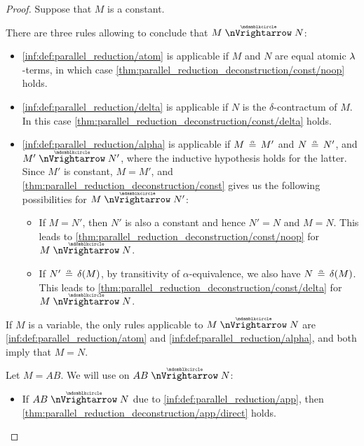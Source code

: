 \begin{proof}
   Suppose that \( M \) is a constant.

  There are three rules allowing to conclude that \( M \ppred N \):
  \begin{itemize}
    \item \ref{inf:def:parallel_reduction/atom} is applicable if \( M \) and \( N \) are equal atomic \( {\mathrm \lambda} \)-terms, in which case \cref{thm:parallel_reduction_deconstruction/const/noop} holds.

    \item \ref{inf:def:parallel_reduction/delta} is applicable if \( N \) is the \( \delta \)-contractum of \( M \). In this case \cref{thm:parallel_reduction_deconstruction/const/delta} holds.

    \item \ref{inf:def:parallel_reduction/alpha} is applicable if \( M \aequiv M' \) and \( N \aequiv N' \), and \( M' \ppred N' \), where the inductive hypothesis holds for the latter. Since \( M' \) is constant, \( M = M' \), and \cref{thm:parallel_reduction_deconstruction/const} gives us the following possibilities for \( M \ppred N' \):

    \begin{itemize}
      \item If \( M = N' \), then \( N' \) is also a constant and hence \( N' = N \) and \( M = N \). This leads to \cref{thm:parallel_reduction_deconstruction/const/noop} for \( M \ppred N \).

      \item If \( N' \aequiv \op*{\delta}(M) \), by transitivity of \( \alpha \)-equivalence, we also have \( N \aequiv \op*{\delta}(M) \). This leads to \cref{thm:parallel_reduction_deconstruction/const/delta} for \( M \ppred N \).
    \end{itemize}
  \end{itemize}

   If \( M \) is a variable, the only rules applicable to \( M \ppred N \) are \ref{inf:def:parallel_reduction/atom} and \ref{inf:def:parallel_reduction/alpha}, and both imply that \( M = N \).

   Let \( M = AB \). We will use  on \( AB \ppred N \):
  \begin{itemize}
    \item If \( AB \ppred N \) due to \ref{inf:def:parallel_reduction/app}, then \cref{thm:parallel_reduction_deconstruction/app/direct} holds.


\end{itemize}
\end{proof}
